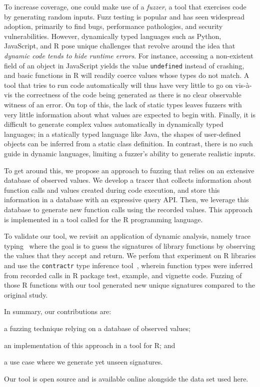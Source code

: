 \documentclass[sigplan,nonacm,anonymous,review]{acmart}
\begin{document}
To increase coverage, one could make use of a \textit{fuzzer}, a tool
that exercises code by generating random inputs.  Fuzz testing is
popular and has seen widespread adoption, primarily to find bugs,
performance pathologies, and security vulnerabilities.  However,
dynamically typed languages such as Python, JavaScript, and R pose unique
challenges that revolve around the idea that \textit{dynamic code
  tends to hide runtime errors}.  For instance, accessing a non-existent
field of an object in JavaScript yields the value {\tt undefined}
instead of crashing, and basic functions in R will readily coerce
values whose types do not match.  A tool that tries to run code
automatically will thus have very little to go on vis-\`a-vis the
correctness of the code being generated as there is no clear
observable witness of an error. On top of this, the lack of static
types leaves fuzzers with very little information about what values
are expected to begin with. Finally, it is difficult to generate complex
values automatically in dynamically typed languages; in a statically typed language like Java, the
shapes of user-defined objects can be inferred from a static class
definition. In contrast, there is no such guide in dynamic languages, limiting
a fuzzer's ability to generate realistic inputs.

To get around this, we propose an approach to fuzzing that relies on
an extensive database of observed values.  We develop a tracer that
collects information about function calls and values created during
code execution, and store this information in a database with an
expressive query API. Then, we leverage this database to generate
new function calls using the recorded values.  This approach is
implemented in a tool called \tool for the R programming language.

To validate our tool, we revisit an application of dynamic analysis,
namely trace typing~\cite{andreasen2016trace} where the goal is to guess
the signatures of library functions by observing the values that they
accept and return. We perfom that experiment on R libraries and use
the {\tt contractr} type inference tool~\cite{turcotte2020designing},
wherein function types were inferred from recorded calls in R package
test, example, and vignette code.  Fuzzing \UFNumFunctions of those R
functions with our tool generated \UFSignatrSignaturesRnd new unique
signatures compared to the original study.

In summary, our contributions are:
\begin{inparaenum}[(1)]
\item a fuzzing technique relying on a database of observed values;
\item an implementation of this approach in a tool for R; and
\item a use case where we generate yet unseen signatures.
\end{inparaenum} 
Our tool is open source and is available online alongside the data set
used here.
\end{document}
